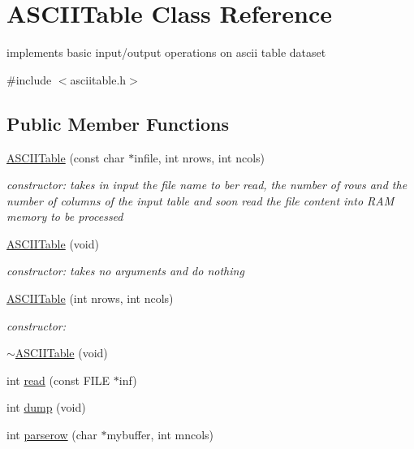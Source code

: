 \hypertarget{classASCIITable}{}\section{A\+S\+C\+I\+I\+Table Class Reference}
\label{classASCIITable}


implements basic input/output operations on ascii table dataset  




{\ttfamily \#include $<$asciitable.\+h$>$}

\subsection*{Public Member Functions}
\begin{DoxyCompactItemize}
\item 
\hyperlink{classASCIITable_af6407338748ab521c979053e9b559ea7}{A\+S\+C\+I\+I\+Table} (const char $\ast$infile, int nrows, int ncols)
\begin{DoxyCompactList}\small\item\em constructor\+: takes in input the file name to ber read, the number of rows and the number of columns of the input table and soon read the file content into R\+AM memory to be processed \end{DoxyCompactList}\item 
\hyperlink{classASCIITable_a75a7961697d0ed657c23b3c823c19e7f}{A\+S\+C\+I\+I\+Table} (void)
\begin{DoxyCompactList}\small\item\em constructor\+: takes no arguments and do nothing \end{DoxyCompactList}\item 
\hyperlink{classASCIITable_ae222c329fe48cc1d681761008f10729f}{A\+S\+C\+I\+I\+Table} (int nrows, int ncols)
\begin{DoxyCompactList}\small\item\em constructor\+: \end{DoxyCompactList}\item 
\hyperlink{classASCIITable_a68a34a07ecdc249d4a48c75797320f8f}{$\sim$\+A\+S\+C\+I\+I\+Table} (void)
\item 
int \hyperlink{classASCIITable_a5ec694dec500699648ef16693277bc22}{read} (const F\+I\+LE $\ast$inf)
\item 
int \hyperlink{classASCIITable_aec29916ecab019573c16364bf33d20e9}{dump} (void)
\item 
int \hyperlink{classASCIITable_a6d06a2ed737f3151484c47bff7fad033}{parserow} (char $\ast$mybuffer, int mncols)
\end{DoxyCompactItemize}
